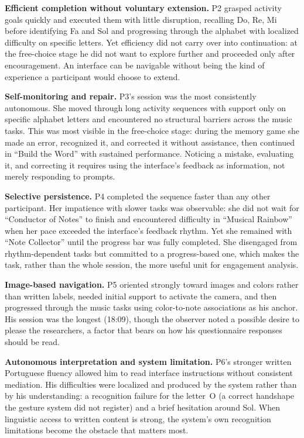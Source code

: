 \documentclass{llncs}
\begin{document}
\textbf{Efficient completion without voluntary extension.} P2 grasped activity goals
quickly and executed them with little disruption, recalling Do, Re, Mi before identifying Fa and Sol and progressing through the alphabet with localized difficulty on specific letters. Yet efficiency did not carry over into continuation: at the free-choice
stage he did not want to explore further and proceeded only after encouragement. An
interface can be navigable without being the kind of experience a participant would
choose to extend.

\textbf{Self-monitoring and repair.} P3's session was the most consistently autonomous.
She moved through long activity sequences with support only on specific alphabet letters
and encountered no structural barriers across the music tasks. This was most visible in
the free-choice stage: during the memory game she made an error, recognized it, and
corrected it without assistance, then continued in ``Build the Word'' with sustained
performance. Noticing a mistake, evaluating it, and correcting it requires using the interface's feedback as information, not merely responding to prompts.

\textbf{Selective persistence.} P4 completed the sequence faster than any other
participant. Her impatience with slower tasks was observable: she did not wait for
``Conductor of Notes'' to finish and encountered difficulty in ``Musical Rainbow'' when
her pace exceeded the interface's feedback rhythm. Yet she remained with ``Note Collector'' until the progress bar was fully completed. She disengaged from rhythm-dependent tasks but committed to a progress-based one, which makes the task, rather than the whole session, the more useful unit for engagement analysis.

\textbf{Image-based navigation.} P5 oriented strongly toward images and colors rather
than written labels, needed initial support to activate the camera, and then progressed through the
music tasks using color-to-note associations as his anchor. His session was the
longest (18:09), though the observer noted a possible desire to please the researchers, a factor that bears on how his questionnaire responses should be read.

\textbf{Autonomous interpretation and system limitation.} P6's stronger written Portuguese
fluency allowed him to read interface instructions without consistent mediation. His
difficulties were localized and produced by the system rather than by his understanding:
a recognition failure for the letter~O (a correct handshape the gesture system did not
register) and a brief hesitation around Sol. When linguistic access to written content is
strong, the system's own recognition limitations become the obstacle that matters most.
\end{document}
